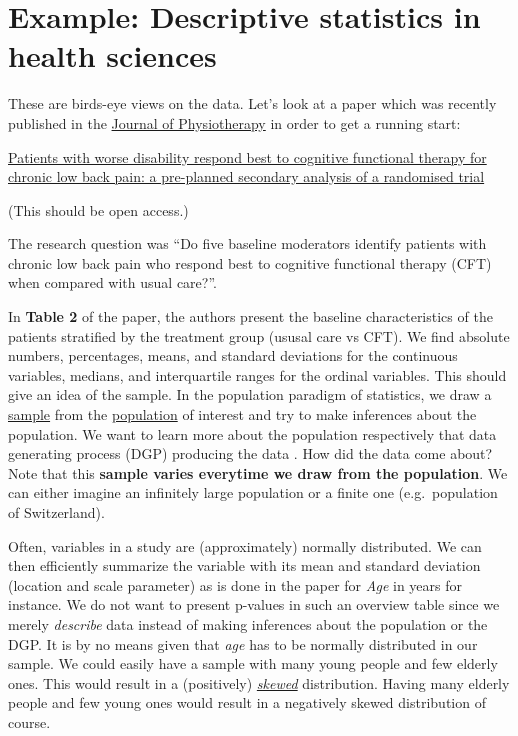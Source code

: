 \documentclass[
]{book}
\begin{document}
\section{Example: Descriptive statistics in health sciences}\label{example_study1_physio}

These are birds-eye views on the data. Let's look at a paper which was recently published in the
\href{https://www.sciencedirect.com/journal/journal-of-physiotherapy}{Journal of Physiotherapy} in order to get a running start:

\href{https://www.sciencedirect.com/science/article/pii/S183695532400081X?via\%3Dihub}{Patients with worse disability respond best to cognitive functional therapy for chronic low back pain: a pre-planned secondary analysis of a randomised trial}

(This should be open access.)

The research question was ``Do five baseline moderators identify patients with chronic low back pain who respond best to cognitive
functional therapy (CFT) when compared with usual care?''.

In \textbf{Table 2} of the paper, the authors present the baseline characteristics of the patients stratified by the treatment group (ususal care vs CFT).
We find absolute numbers, percentages, means, and standard deviations for the continuous variables, medians, and interquartile ranges for the ordinal variables.
This should give an idea of the sample. In the population paradigm of statistics, we draw a \href{https://en.wikipedia.org/wiki/Sampling_(statistics)}{sample} from
the \href{https://en.wikipedia.org/wiki/Statistical_population}{population} of interest and try to make inferences about the population. We want to learn
more about the population respectively that data generating process (DGP) producing the data \citep[6-8]{westfall2020}. How did the data come about?
Note that this \textbf{sample varies everytime we draw from the population}.
We can either imagine an infinitely large population or a finite one (e.g.~population of Switzerland).

Often, variables in a study are (approximately) normally distributed.
We can then efficiently summarize the variable with its mean and standard deviation (location and scale parameter) as is done
in the paper for \emph{Age} in years for instance. We do not want to present p-values in such an overview table since we merely \emph{describe} data instead of
making inferences about the population or the DGP.
It is by no means given that \emph{age} has to be normally distributed in our sample. We could easily have a sample with many young people and few elderly ones.
This would result in a (positively) \href{https://en.wikipedia.org/wiki/Skewness}{\emph{skewed}} distribution. Having many elderly people and few young ones would
result in a negatively skewed distribution of course.
\end{document}
